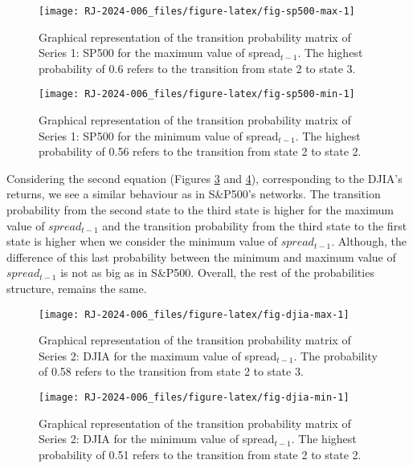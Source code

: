 \begin{figure}

{\centering \texttt{[image: RJ-2024-006\_files/figure-latex/fig-sp500-max-1]} 

}

\caption{Graphical representation of the transition probability matrix of Series 1: SP500 for the maximum value of spread$_{t-1}$. The highest probability of 0.6 refers to the transition from state 2 to state 3.}\label{fig:fig-sp500-max}
\end{figure}

\begin{figure}

{\centering \texttt{[image: RJ-2024-006\_files/figure-latex/fig-sp500-min-1]} 

}

\caption{Graphical representation of the transition probability matrix of Series 1: SP500 for the minimum value of spread$_{t-1}$. The highest probability of 0.56 refers to the transition from state 2 to state 2.}\label{fig:fig-sp500-min}
\end{figure}

Considering the second equation (Figures \ref{fig:fig-djia-max} and \ref{fig:fig-djia-min}), corresponding to the DJIA's returns, we see a similar behaviour as in S\&P500's networks. The transition probability from the second state to the third state is higher for the maximum value of \(spread_{t-1}\) and the transition probability from the third state to the first state is higher when we consider the minimum value of \(spread_{t-1}\). Although, the difference of this last probability between the minimum and maximum value of \(spread_{t-1}\) is not as big as in S\&P500. Overall, the rest of the probabilities structure, remains the same.

\begin{figure}

{\centering \texttt{[image: RJ-2024-006\_files/figure-latex/fig-djia-max-1]} 

}

\caption{Graphical representation of the transition probability matrix of Series 2: DJIA for the maximum value of spread$_{t-1}$. The probability of 0.58 refers to the transition from state 2 to state 3.}\label{fig:fig-djia-max}
\end{figure}

\begin{figure}

{\centering \texttt{[image: RJ-2024-006\_files/figure-latex/fig-djia-min-1]} 

}

\caption{Graphical representation of the transition probability matrix of Series 2: DJIA for the minimum value of spread$_{t-1}$. The highest probability of 0.51 refers to the transition from state 2 to state 2.}\label{fig:fig-djia-min}
\end{figure}

